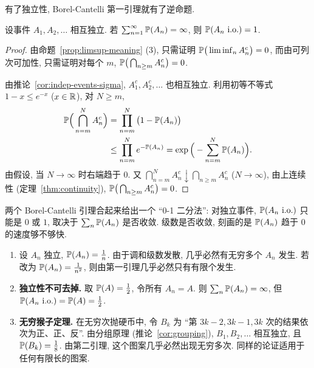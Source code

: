 有了独立性, Borel-Cantelli 第一引理就有了逆命题.

\begin{theorem}\label{thm:bc2}
设事件 $A_1,A_2,\dots$ 相互独立. 若 $\sum_{n=1}^\infty\P(A_n)=\infty$, 则 $\P(A_n\ \text{i.o.})=1$.
\end{theorem}

\begin{proof}
由命题~\ref{prop:limsup-meaning} (3), 只需证明 $\P\big(\liminf_n A_n^c\big)=0$, 而由可列次可加性, 只需证明对每个 $m$, $\P\big(\bigcap_{n\ge m}A_n^c\big)=0$.

由推论~\ref{cor:indep-events-sigma}, $A_1^c,A_2^c,\dots$ 也相互独立. 利用初等不等式 $1-x\le e^{-x}$ ($x\in\R$), 对 $N\ge m$,
\begin{align*}
\P\Big(\bigcap_{n=m}^N A_n^c\Big)&=\prod_{n=m}^N\big(1-\P(A_n)\big)\\
&\le\prod_{n=m}^N e^{-\P(A_n)}=\exp\Big(-\sum_{n=m}^N\P(A_n)\Big).
\end{align*}
由假设, 当 $N\to\infty$ 时右端趋于 $0$. 又 $\bigcap_{n=m}^N A_n^c\downarrow\bigcap_{n\ge m}A_n^c$ ($N\to\infty$), 由上连续性 (定理~\ref{thm:continuity}), $\P\big(\bigcap_{n\ge m}A_n^c\big)=0$.
\end{proof}

\begin{intuition}
两个 Borel-Cantelli 引理合起来给出一个 ``0-1 二分法'': 对独立事件, $\P(A_n\ \text{i.o.})$ 只能是 $0$ 或 $1$, 取决于 $\sum_n\P(A_n)$ 是否收敛. 级数是否收敛, 刻画的是 $\P(A_n)$ 趋于 $0$ 的速度够不够快.
\end{intuition}

\begin{example}\label{ex:bc2}
\begin{enumerate}
\item 设 $A_n$ 独立, $\P(A_n)=\frac{1}{n}$. 由于调和级数发散, 几乎必然有无穷多个 $A_n$ 发生. 若改为 $\P(A_n)=\frac{1}{n^2}$, 则由第一引理几乎必然只有有限个发生.
\item \textbf{独立性不可去掉.} 取 $\P(A)=\frac{1}{2}$, 令所有 $A_n=A$. 则 $\sum_n\P(A_n)=\infty$, 但 $\P(A_n\ \text{i.o.})=\P(A)=\frac{1}{2}$.
\item \textbf{无穷猴子定理.} 在无穷次抛硬币中, 令 $B_k$ 为 ``第 $3k-2,3k-1,3k$ 次的结果依次为正、正、反''. 由分组原理 (推论~\ref{cor:grouping}), $B_1,B_2,\dots$ 相互独立, 且 $\P(B_k)=\frac{1}{8}$. 由第二引理, 这个图案几乎必然出现无穷多次. 同样的论证适用于任何有限长的图案.
\end{enumerate}
\end{example}

